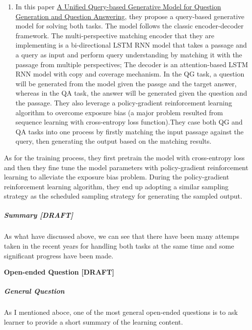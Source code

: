 \documentclass{acm_proc_article-sp}
\renewcommand{\paragraph}[1]{\vskip 6pt\noindent\textbf{#1 }}
\providecommand{\tightlist}{%
  \setlength{\itemsep}{0pt}\setlength{\parskip}{0pt}}
\begin{document}
\begin{enumerate}
\def\labelenumi{\arabic{enumi}.}
\setcounter{enumi}{3}
\tightlist
\item
  In this paper \href{https://arxiv.org/pdf/1709.01058.pdf}{A Unified
  Query-based Generative Model for Question Generation and Question
  Answering}, they propose a query-based generative model for solving
  both tasks. The model follows the classic encoder-decoder framework.
  The multi-perspective matching encoder that they are implementing is a
  bi-directional LSTM RNN model that takes a passage and a query as
  input and perform query understanding by matching it with the passage
  from multiple perspectives; The decoder is an attention-based LSTM RNN
  model with copy and coverage mechanism. In the QG task, a question
  will be generated from the model given the passge and the target
  answer, whereas in the QA task, the answer will be generated given the
  question and the passage. They also leverage a policy-gradient
  reinforcement learning algorithm to overcome exposure bias (a major
  problem resulted from sequence learning with cross-entropy loss
  function).They case both QG and QA tasks into one process by firstly
  matching the input passage against the query, then generating the
  output based on the matching results.
\end{enumerate}

As for the training process, they first pretrain the model with
cross-entropy loss and then they fine tune the model parameters with
policy-gradient reinforcement learning to alleviate the exposure bias
problem. During the policy-gradient reinforcement learning algorithm,
they end up adopting a similar sampling strategy as the scheduled
sampling strategy for generating the sampled output.

\subparagraph{Summary {[}DRAFT{]}}\label{summary-draft}

As what have discussed above, we can see that there have been many
attemps taken in the recent years for handling both tasks at the same
time and some significant progress have been made.

\paragraph{Open-ended Question
{[}DRAFT{]}}\label{open-ended-question-draft}

\subparagraph{General Question}\label{general-question}

As I mentioned aboce, one of the most general open-ended questions is to
ask learner to provide a short summary of the learning content.
\end{document}
